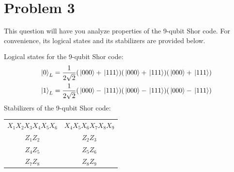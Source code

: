 \documentclass[10pt]{article}
\begin{document}
	\section*{Problem 3}
	This question will have you analyze properties of the 9-qubit Shor code. For convenience, its logical states and 
	its stabilizers are provided below. 

	Logical states for the 9-qubit Shor code:
	\begin{align*}
		\ket*{0}_L &= \frac{1}{2\sqrt{2} }(\ket*{000} + \ket*{111})(\ket*{000} + \ket*{111})(\ket*{000} + \ket*{111})\\
		\ket*{1}_L &= \frac{1}{2\sqrt{2} }(\ket*{000} - \ket*{111}) (\ket*{000} - \ket*{111})(\ket*{000} - \ket*{111}) \\
	\end{align*}
	Stabilizers of the 9-qubit Shor code:
	\begin{center}
		\begin{tabular}{c|c}
			\( X_1X_2X_3X_4X_5X_6 \) & \( X_4X_5X_6X_7X_8X_9 \) \\
			\( Z_1Z_2 \) & \( Z_2Z_3 \) \\
			\( Z_4Z_5 \) & \( Z_5Z_6 \) \\
			\( Z_7Z_8 \) & \( Z_8Z_9 \)
		\end{tabular}
	\end{center}
\end{document}
